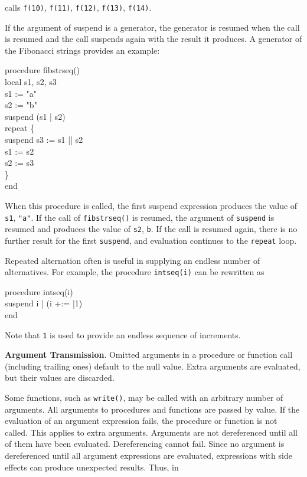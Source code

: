 
\noindent calls \texttt{f(10)}, \texttt{f(11)}, \texttt{f(12)},
\texttt{f(13)}, \texttt{f(14)}.

If the argument of suspend is a generator, the generator is resumed
when the call is resumed and the call suspends again with the result
it produces. A generator of the Fibonacci strings provides an example:

\begin{iconcode}
\>procedure fibstrseq()\\
\>\>local s1, s2, s3\\
\>\>s1 := "a"\\
\>\>s2 := "b"\\
\>\>suspend (s1 | s2)\\
\>\>repeat \{\\
\>\>\>suspend s3 := s1 || s2\\
\>\>\>s1 := s2\\
\>\>\>s2 := s3\\
\>\>\>\}\\
\>end
\end{iconcode}

When this procedure is called, the first suspend expression produces
the value of \texttt{s1}, \texttt{"a"}. If the call of
\texttt{fibstrseq()} is resumed, the argument of \texttt{suspend} is
resumed and produces the value of \texttt{s2},
\texttt{{\textquotedbl}b{\textquotedbl}}. If the call is resumed
again, there is no further result for the first \texttt{suspend}, and
evaluation continues to the \texttt{repeat} loop.

Repeated alternation often is useful in supplying an endless number of
alternatives. For example, the procedure \texttt{intseq(i)} can be
rewritten as

\begin{iconcode}
\>procedure intseq(i)\\
\>\>suspend i | (i +:= |1)\\
\>end
\end{iconcode}

Note that \texttt{{\textbar}1} is used to provide an endless sequence
of increments.

\textbf{Argument Transmission}. Omitted arguments in a procedure or
function call (including trailing ones) default to the null
value. Extra arguments are evaluated, but their values are discarded.

Some functions, such as \texttt{write()}, may be called with an
arbitrary number of arguments. All arguments to procedures and
functions are passed by value. If the evaluation of an argument
expression fails, the procedure or function is not called. This
applies to extra arguments. Arguments are not dereferenced until all
of them have been evaluated. Dereferencing cannot fail. Since no
argument is dereferenced until all argument expressions are evaluated,
expressions with side effects can produce unexpected results. Thus, in

